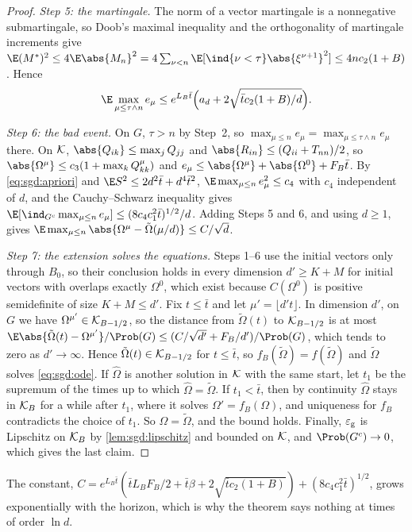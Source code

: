 \begin{refsection}
\begin{proof}
\emph{Step 5: the martingale.} The norm of a vector martingale is a nonnegative submartingale, so Doob's maximal inequality and the orthogonality of martingale increments give $\E(M^*)^2\le4\E\abs{M_n}^2=4\sum_{\nu<n}\E[\ind\{\nu<\tau\}\abs{\xi^{\nu+1}}^2]\le4nc_2(1+B)$. Hence
\[
\E\max_{\mu\le\tau\wedge n}e_\mu\le e^{L_B\bar t}\Bigl(a_d+2\sqrt{\bar tc_2(1+B)/d}\Bigr).
\]

\emph{Step 6: the bad event.} On $G$, $\tau>n$ by Step~2, so $\max_{\mu\le n}e_\mu=\max_{\mu\le\tau\wedge n}e_\mu$ there. On $\mathcal K$, $\abs{Q_{ik}}\le\max_jQ_{jj}$ and $\abs{R_{in}}\le(Q_{ii}+T_{nn})/2$, so $\abs{\Omega^\mu}\le c_3(1+\max_kQ^\mu_{kk})$ and $e_\mu\le\abs{\Omega^\mu}+\abs{\Omega^0}+F_B\bar t$. By \eqref{eq:sgd:apriori} and $\E S^2\le2d^2\bar t+d^4\bar t^2$, $\E\max_{\mu\le n}e_\mu^2\le c_4$ with $c_4$ independent of $d$, and the Cauchy--Schwarz inequality gives $\E[\ind_{G^c}\max_{\mu\le n}e_\mu]\le(8c_4c_1^2\bar t)^{1/2}/d$. Adding Steps 5 and 6, and using $d\ge1$, gives $\E\max_{\mu\le n}\abs{\Omega^\mu-\tilde\Omega(\mu/d)}\le C/\sqrt d$.

\emph{Step 7: the extension solves the equations.} Steps 1--6 use the initial vectors only through $B_0$, so their conclusion holds in every dimension $d'\ge K+M$ for initial vectors with overlaps exactly $\Omega^0$, which exist because $C(\Omega^0)$ is positive semidefinite of size $K+M\le d'$. Fix $t\le\bar t$ and let $\mu'=\lfloor d't\rfloor$. In dimension $d'$, on $G$ we have $\Omega^{\mu'}\in\mathcal K_{B-1/2}$, so the distance from $\tilde\Omega(t)$ to $\mathcal K_{B-1/2}$ is at most $\E\abs{\tilde\Omega(t)-\Omega^{\mu'}}/\Prob(G)\le(C/\sqrt{d'}+F_B/d')/\Prob(G)$, which tends to zero as $d'\to\infty$. Hence $\tilde\Omega(t)\in\mathcal K_{B-1/2}$ for $t\le\bar t$, so $f_B(\tilde\Omega)=f(\tilde\Omega)$ and $\tilde\Omega$ solves \eqref{eq:sgd:ode}. If $\hat\Omega$ is another solution in $\mathcal K$ with the same start, let $t_1$ be the supremum of the times up to which $\hat\Omega=\tilde\Omega$. If $t_1<\bar t$, then by continuity $\hat\Omega$ stays in $\mathcal K_B$ for a while after $t_1$, where it solves $\Omega'=f_B(\Omega)$, and uniqueness for $f_B$ contradicts the choice of $t_1$. So $\Omega=\tilde\Omega$, and the bound holds. Finally, $\varepsilon_{\mathrm g}$ is Lipschitz on $\mathcal K_B$ by \cref{lem:sgd:lipschitz} and bounded on $\mathcal K$, and $\Prob(G^c)\to0$, which gives the last claim.
\end{proof}

The constant, $C=e^{L_B\bar t}(\bar tL_BF_B/2+\bar t\beta+2\sqrt{\bar tc_2(1+B)})+(8c_4c_1^2\bar t)^{1/2}$, grows exponentially with the horizon, which is why the theorem says nothing at times of order $\ln d$.


\end{refsection}
